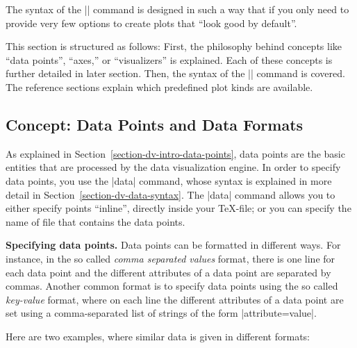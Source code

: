 The syntax of the |\datavisualization| command is designed in such a way that
if you only need to provide very few options to create plots that ``look good
by default''.

This section is structured as follows: First, the philosophy behind concepts
like ``data points'', ``axes,'' or ``visualizers'' is explained. Each of these
concepts is further detailed in later section. Then, the syntax of the
|\datavisualization| command is covered. The reference sections explain which
predefined plot kinds are available.


\subsection{Concept: Data Points and Data Formats}

As explained in Section~\ref{section-dv-intro-data-points}, data points are the
basic entities that are processed by the data visualization engine. In order to
specify data points, you use the |data| command, whose syntax is explained in
more detail in Section~\ref{section-dv-data-syntax}. The |data| command allows
you to either specify points ``inline'', directly inside your \TeX-file; or you
can specify the name of file that contains the data points.

\medskip
\textbf{Specifying data points.}
Data points can be formatted in different ways. For instance, in the so called
\emph{comma separated values} format, there is one line for each data point and
the different attributes of a data point are separated by commas. Another
common format is to specify data points using the so called \emph{key-value}
format, where on each line the different attributes of a data point are set
using a comma-separated list of strings of the form |attribute=value|.

Here are two examples, where similar data is given in different formats:
%
\begin{codeexample}[]
\end{codeexample}

\begin{codeexample}[]
\end{codeexample}

